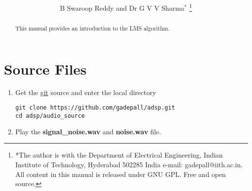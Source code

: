 \documentclass[journal,12pt,twocolumn]{IEEEtran}
\renewcommand\thesection{\arabic{section}}
\begin{document}
\let\StandardTheFigure\thefigure
\renewcommand{\thefigure}{\thesection}



\makeatletter
{}
\makeatother

\let\StandardTheFigure\thefigure
\let\StandardTheTable\thetable





\def\putbox#1#2#3{\makebox[0in][l]{\makebox[#1][l]{}\raisebox{\baselineskip}[0in][0in]{\raisebox{#2}[0in][0in]{#3}}}}
     \def\rightbox#1{\makebox[0in][r]{#1}}
     \def\centbox#1{\makebox[0in]{#1}}
     \def\topbox#1{\raisebox{-\baselineskip}[0in][0in]{#1}}
     \def\midbox#1{\raisebox{-0.5\baselineskip}[0in][0in]{#1}}

\vspace{3cm}

\title{ 
}

\author{B Swaroop Reddy and Dr G V V Sharma$^{*}$%
	\thanks{*The author is with the Department
		of Electrical Engineering, Indian Institute of Technology, Hyderabad
		502285 India e-mail:  gadepall@iith.ac.in. All content in this manual is released under GNU GPL.  Free and open source.}
	
}	

\maketitle

\tableofcontents
\bigskip

\begin{abstract}
	
This manual provides an introduction to the LMS algorithm.
		
\end{abstract}
\section{Source Files}
\begin{enumerate}
\item Get the \href{{https://github.com/gadepall/adsp.git}}{\url{git}} source and enter the local directory
\begin{lstlisting}
git clone https://github.com/gadepall/adsp.git
cd adsp/audio_source
\end{lstlisting}
\item Play the \textbf{signal\_noise.wav} and \textbf{noise.wav} file.
\end{enumerate}
%
\end{document}
